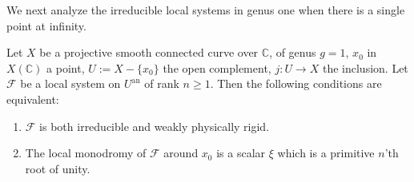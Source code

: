 We next analyze the irreducible local systems in genus one when there is a
single point at infinity.

\setcounter{theorem}{3}
\begin{lemma}
\label{lem:1.4.4}
Let \(X\) be a projective smooth connected curve over \(\mathbb{C}\), of genus
\(g=1\), \(x_0\) in \(X(\mathbb{C})\) a point, \(U:=X-\{x_0\}\) the open
complement, \(j:U\to X\) the inclusion. Let \(\mathcal{F}\) be a local system
on \(U^{\mathrm{an}}\) of rank \(n\geq 1\). Then the following conditions are
equivalent:
\leavevmode\par
\begin{enumerate}[label=(\arabic*)]
\item \(\mathcal{F}\) is both irreducible and weakly physically rigid.
\item The local monodromy of \(\mathcal{F}\) around \(x_0\) is a scalar
\(\xi\) which is a primitive \(n\)'th root of unity.
\end{enumerate}
\end{lemma}

